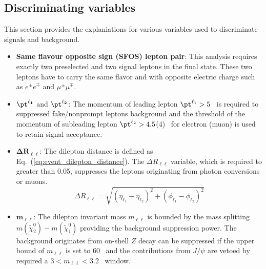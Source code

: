 \subsection{Discriminating variables}
\label{subsec:event_discriminating_variables}
This section provides the explaniations for various variables used to discriminate signals and background.
%
\begin{itemize}
    \item \textbf{Same flavour opposite sign (SFOS) lepton pair}: This analysis requires exactly two preselected and two signal leptons in the final state.
    These two leptons have to carry the same flavor and with opposite electric charge such as $e^{\pm}e^{\mp}$ and $\mu^{\pm}\mu^{\mp}$.

    \item $\mathbf{\pt^{\ell_{1}}}$ and $\mathbf{\pt^{\ell_{2}}}$: The momentum of leading lepton $\pt^{\ell_{1}} > 5$~{\GeV} is required to suppressed fake/nonprompt leptons background and the threshold of the momentum of subleading lepton $\pt^{\ell_{2}} > 4.5$(4)~{\GeV} for electron (muon) is used to retain signal acceptance.

    \item $\mathbf{\Delta R_{\ell\ell}}$: The dilepton distance is defined as Eq.~(\ref{eq:event_dilepton_distance}).
    The $\Delta R_{\ell\ell}$ variable, which is required to greater than 0.05, suppresses the leptons originating from photon conversions or muons.
    \begin{equation}
        \Delta R_{\ell \ell} = \sqrt{(\eta_{\ell_{1}} - \eta_{\ell_{2}})^{2} + (\phi_{\ell_{1}} - \phi_{\ell_{2}})^{2}}
        \label{eq:event_dilepton_distance}
    \end{equation}

    \item $\mathbf{m_{\ell\ell}}$: The dilepton invariant mass $m_{\ell\ell}$ is bounded by the mass splitting $m(\widetilde{\chi}^{0}_{2}) - m(\widetilde{\chi}^{0}_{1})$ providing the background suppression power.
    The background originates from on-shell $Z$ decay can be suppressed if the upper bound of $m_{\ell\ell}$ is set to 60~{\GeV} and the contributions from $J/\psi$ are vetoed by required a $3 < m_{\ell\ell} < 3.2$~{\GeV} window.


\end{itemize}

